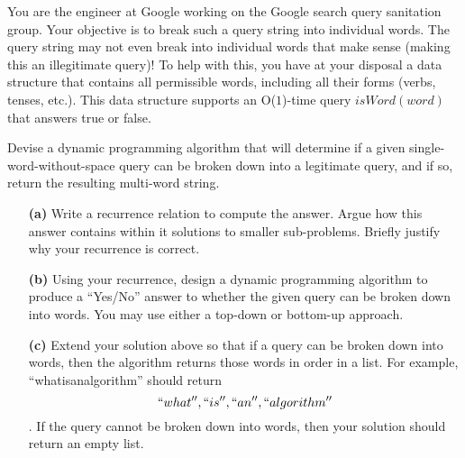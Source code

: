 \documentclass[11pt]{article}
\theoremstyle{definition}
\theoremstyle{theorem}
\begin{document}
You are the engineer at Google working on the Google search query sanitation group. Your objective is to break such a query string into individual words. The query string may not even break into individual words that make sense (making this an illegitimate query)! To help with this, you have at your disposal a data structure that contains all permissible words, including all their forms (verbs, tenses, etc.). This data structure supports an O($1$)-time query $isWord(word)$ that answers true or false.

Devise a dynamic programming algorithm that will determine if a given single-word-without-space query can be broken down into a legitimate query, and if so, return the resulting multi-word string. 

\begin{itemize}
\item[{\bf (a)}] Write a recurrence relation to compute the answer. Argue how this answer contains within it solutions to smaller sub-problems. Briefly justify why your recurrence is correct.

\item[{\bf (b)}] Using your recurrence, design a dynamic programming algorithm to produce a ``Yes/No'' answer to whether the given query can be broken down into words.  You may use either a top-down or bottom-up approach.\\
\begin{algorithm}[H]
\end{algorithm}
  
\item[{\bf (c)}] Extend your solution above so that if a query can be broken down into words, then the algorithm returns those words in order in a list. For example, ``whatisanalgorithm'' should return \[``what'',``is'',``an'',``algorithm''\]. If the query cannot be broken down into words, then your solution should return an empty list. \\
\begin{algorithm}[H]
\end{algorithm}
\end{itemize}
\end{document}
